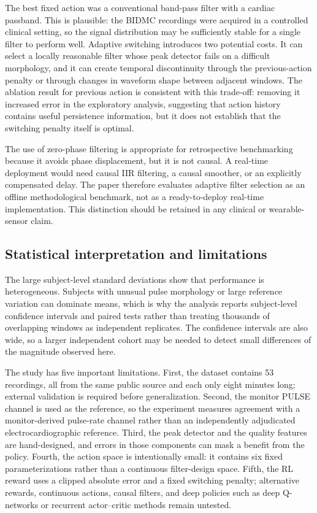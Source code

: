 \documentclass{elektr}
\begin{document}
The best fixed action was a conventional band-pass filter with a cardiac passband. This is plausible: the BIDMC recordings were acquired in a controlled clinical setting, so the signal distribution may be sufficiently stable for a single filter to perform well. Adaptive switching introduces two potential costs. It can select a locally reasonable filter whose peak detector fails on a difficult morphology, and it can create temporal discontinuity through the previous-action penalty or through changes in waveform shape between adjacent windows. The ablation result for previous action is consistent with this trade-off: removing it increased error in the exploratory analysis, suggesting that action history contains useful persistence information, but it does not establish that the switching penalty itself is optimal.

The use of zero-phase filtering is appropriate for retrospective benchmarking because it avoids phase displacement, but it is not causal. A real-time deployment would need causal IIR filtering, a causal smoother, or an explicitly compensated delay. The paper therefore evaluates adaptive filter selection as an offline methodological benchmark, not as a ready-to-deploy real-time implementation. This distinction should be retained in any clinical or wearable-sensor claim.

\subsection{Statistical interpretation and limitations}

The large subject-level standard deviations show that performance is heterogeneous. Subjects with unusual pulse morphology or large reference variation can dominate means, which is why the analysis reports subject-level confidence intervals and paired tests rather than treating thousands of overlapping windows as independent replicates. The confidence intervals are also wide, so a larger independent cohort may be needed to detect small differences of the magnitude observed here.

The study has five important limitations. First, the dataset contains 53 recordings, all from the same public source and each only eight minutes long; external validation is required before generalization. Second, the monitor PULSE channel is used as the reference, so the experiment measures agreement with a monitor-derived pulse-rate channel rather than an independently adjudicated electrocardiographic reference. Third, the peak detector and the quality features are hand-designed, and errors in those components can mask a benefit from the policy. Fourth, the action space is intentionally small: it contains six fixed parameterizations rather than a continuous filter-design space. Fifth, the RL reward uses a clipped absolute error and a fixed switching penalty; alternative rewards, continuous actions, causal filters, and deep policies such as deep Q-networks or recurrent actor--critic methods remain untested.
\end{document}
